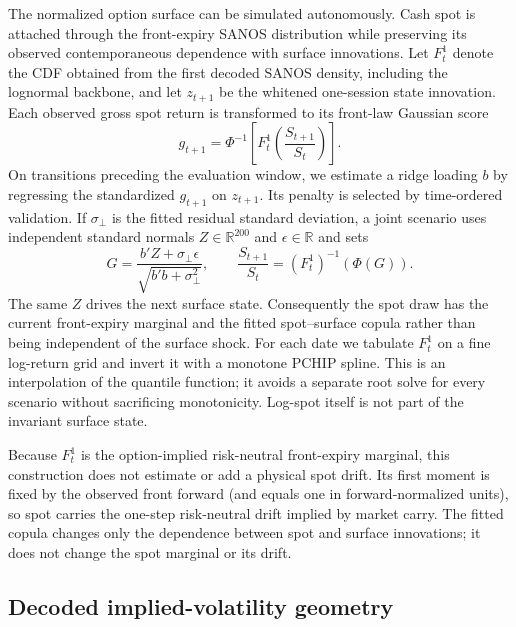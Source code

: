 \documentclass[11pt,a4paper]{article}
\begin{document}
The normalized option surface can be simulated autonomously.  Cash spot is
attached through the front-expiry SANOS distribution while preserving its
observed contemporaneous dependence with surface innovations.  Let
$F_t^1$ denote the CDF obtained from the first decoded SANOS density, including
the lognormal backbone, and let $z_{t+1}$ be the whitened one-session state
innovation.  Each observed gross spot return is transformed to its front-law
Gaussian score
\begin{equation}
  g_{t+1}=\Phi^{-1}\!\left[
    F_t^1\!\left(\frac{S_{t+1}}{S_t}\right)
  \right].
  \label{eq:front-spot-score}
\end{equation}
On transitions preceding the evaluation window, we estimate a ridge loading
$b$ by regressing the standardized $g_{t+1}$ on $z_{t+1}$.  Its penalty is
selected by time-ordered validation.  If $\sigma_\perp$ is the fitted residual
standard deviation, a joint scenario uses independent standard normals
$Z\in\mathbb R^{200}$ and $\epsilon\in\mathbb R$ and sets
\begin{equation}
  G=\frac{b'Z+\sigma_\perp\epsilon}
          {\sqrt{b'b+\sigma_\perp^2}},
  \qquad
  \frac{S_{t+1}}{S_t}
    =(F_t^1)^{-1}\!\left(\Phi(G)\right).
  \label{eq:spot-block}
\end{equation}
The same $Z$ drives the next surface state.  Consequently the spot draw has
the current front-expiry marginal and the fitted spot--surface copula rather
than being independent of the surface shock.  For each date we tabulate
$F_t^1$ on a fine log-return grid and invert it with a monotone PCHIP spline.
This is an interpolation of the quantile function; it avoids a separate
root solve for every scenario without sacrificing monotonicity.  Log-spot
itself is not part of the invariant surface state.

Because $F_t^1$ is the option-implied risk-neutral front-expiry marginal, this
construction does not estimate or add a physical spot drift.  Its first moment
is fixed by the observed front forward (and equals one in forward-normalized
units), so spot carries the one-step risk-neutral drift implied by market
carry.  The fitted copula changes only the dependence between spot and surface
innovations; it does not change the spot marginal or its drift.

\subsection{Decoded implied-volatility geometry}
\label{sec:pca}
\end{document}
